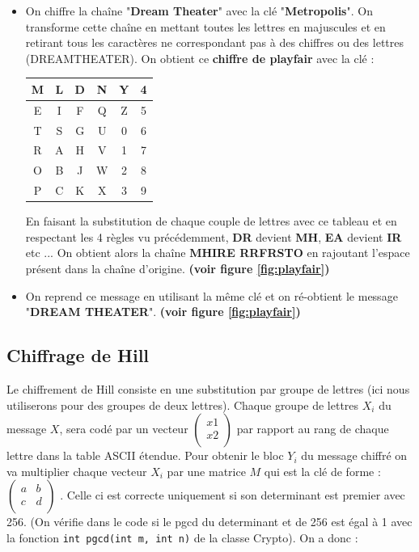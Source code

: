 \documentclass{article}
\begin{document}
\begin{itemize}
\item On chiffre la chaîne "\textbf{Dream Theater}" avec la clé "\textbf{Metropolis}". On transforme cette chaîne en mettant toutes les lettres en majuscules et en retirant tous les caractères ne correspondant pas à des chiffres ou des lettres (DREAMTHEATER). On obtient ce \textbf{chiffre de playfair} avec la clé :
\begin{center}
\begin{tabular}{|c|c|c|c|c|c|}
\hline
M & L & D & N & Y & 4 \\
\hline
E & I & F & Q & Z & 5 \\
\hline
T & S & G & U & 0 & 6 \\
\hline
R & A & H & V & 1 & 7 \\
\hline
O & B & J & W & 2 & 8 \\
\hline
P & C & K & X & 3 & 9 \\
\hline
\end{tabular} 
\end{center}
\vspace{1\baselineskip}

En faisant la substitution de chaque couple de lettres avec ce tableau et en respectant les 4 règles vu précédemment, \textbf{DR} devient \textbf{MH}, \textbf{EA} devient \textbf{IR} etc ... On obtient alors la chaîne \textbf{MHIRE RRFRSTO} en rajoutant l'espace présent dans la chaîne d'origine. \textbf{(voir figure  \ref{fig:playfair})}

\item On reprend ce message en utilisant la même clé et on ré-obtient le message "\textbf{DREAM THEATER}". \textbf{(voir figure  \ref{fig:playfair})}
 
\end{itemize}

\subsection{Chiffrage de Hill}\label{sub:Hill}

Le chiffrement de Hill consiste en une substitution par groupe de lettres (ici nous utiliserons pour des groupes de deux lettres). Chaque groupe de lettres $X_{i}$ du message $X$, sera codé par un vecteur $\begin{pmatrix}
x1\\
x2\\
\end{pmatrix}$ par rapport au rang de chaque lettre dans la table ASCII étendue. Pour obtenir le bloc $Y_{i}$ du message chiffré on va multiplier chaque vecteur $X_{i}$ par une matrice $M$ qui est la clé de forme :
$\begin{pmatrix}
a&b\\
c&d\\
\end{pmatrix}$
. Celle ci est correcte uniquement si son determinant est premier avec 256. (On vérifie dans le code si le pgcd du determinant et de 256 est égal à 1 avec la fonction \verb+int pgcd(int m, int n)+ de la classe Crypto).
On a donc : 
\end{document}
